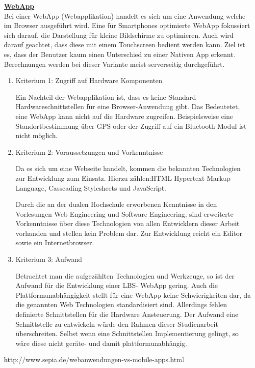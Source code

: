 \textbf{\underline{WebApp}}\\
Bei einer WebApp (Webapplikation) handelt es sich um eine Anwendung welche im 
Browser ausgeführt wird. Eine für Smartphones optimierte WebApp fokussiert sich 
darauf, die Darstellung für kleine Bildschirme zu optimieren. Auch wird darauf 
geachtet, dass diese mit einem Touchscreen bedient werden kann. Ziel ist es, dass 
der Benutzer kaum einen Unterschied zu einer Nativen App erkennt. Berechnungen 
werden bei dieser Variante meist serverseitig durchgeführt. 

\begin{enumerate}
\item Kriterium 1: Zugriff auf Hardware Komponenten

Ein Nachteil der Webapplikation ist, dass es keine Standard-Hardwareschnittstellen 
für eine Browser-Anwendung gibt. Das Bedeutetet, eine WebApp kann nicht auf die 
Hardware zugreifen. Beispielsweise eine Standortbestimmung über GPS  oder der 
Zugriff auf ein Bluetooth Modul ist nicht möglich.

\item Kriterium 2: Voraussetzungen und Vorkenntnisse

Da es sich um eine Webseite handelt, kommen die bekannten Technologien zur 
Entwicklung zum Einsatz. Hierzu zählen:HTML Hypertext Markup Language, Casscading 
Stylesheets und JavaScript.

Durch die an der dualen Hochschule erworbenen Kenntnisse in den Vorlesungen Web 
Engineering und Software Engineering, sind erweiterte Vorkenntnisse über diese 
Technologien von allen Entwicklern dieser Arbeit vorhanden und stellen kein Problem 
dar. Zur Entwicklung reicht ein Editor sowie ein Internetbrowser. 

\item Kriterium 3: Aufwand

Betrachtet man die aufgezählten Technologien und Werkzeuge, so ist der Aufwand für 
die Entwicklung einer LBS- WebApp gering. Auch die Plattformunabhängigkeit stellt 
für eine WebApp keine Schwierigkeiten dar, da die genannten Web Technologien 
standardisiert sind. Allerdings fehlen definierte Schnittstellen für die Hardware 
Ansteuerung. Der Aufwand eine Schnittstelle zu entwickeln würde den Rahmen dieser 
Studienarbeit überschreiten. Selbst wenn eine Schnittstellen Implementierung 
gelingt, so wäre diese nicht geräte- und damit plattformunabhängig.
\end{enumerate}

http://www.sepia.de/webanwendungen-vs-mobile-apps.html

